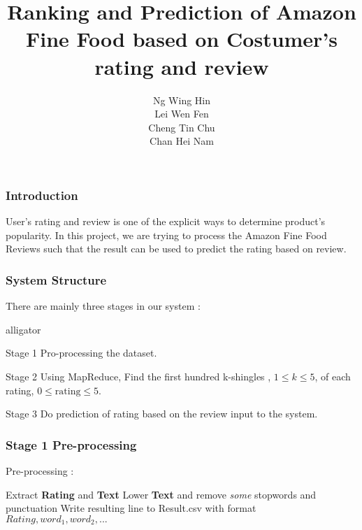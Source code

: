 \documentclass[11pt]{beamer}
\author{Ng Wing Hin\\Lei Wen Fen\\Cheng Tin Chu\\Chan Hei Nam}
\title{Ranking and Prediction of Amazon Fine Food based on Costumer's rating and review}
\date{}
\begin{document}
\theoremstyle{plain}
\newtheorem{thm}{Theorem}[section] %

\theoremstyle{definition}
\newtheorem{defn}[thm]{Definition} %
\newtheorem{exmp}[thm]{Example} %
\newtheorem{prop}{Property}[section]


\begin{frame}
\titlepage
\end{frame}


\begin{frame}
\frametitle{Introduction}
User's rating and review is one of the explicit ways to determine product's popularity. In this project, we are trying to process the Amazon Fine Food Reviews such that the result can be used to predict the rating based on review.
\end{frame}

\begin{frame}
\frametitle{System Structure}
There are mainly three stages in our system : 
\begin{labeling}{alligator}
\item [Stage 1] Pro-processing the dataset.
\item [Stage 2] Using MapReduce, Find the first hundred k-shingles , \(1\leq k\leq 5\), of each rating, \(0\leq \mbox{rating} \leq 5\).
\item [Stage 3] Do prediction of rating based on the review input to the system. 
\end{labeling}
\end{frame}

\begin{frame}
\frametitle{Stage 1 Pre-processing}
Pre-processing :
\begin{algorithm}[H]
 {
 	Extract \textbf{Rating} and \textbf{Text}\;
 	Lower \textbf{Text} and remove \emph{some} stopwords and punctuation\;
 	Write resulting line to Result.csv with format \(Rating, word_{1}, word_{2}, ...\)\;
 }
\end{algorithm}
\end{frame}
\end{document}
